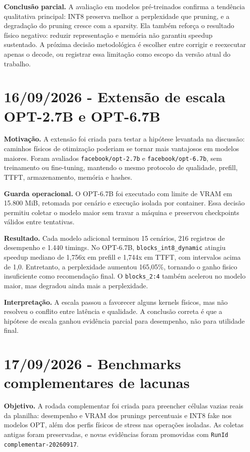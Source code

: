 \textbf{Conclusão parcial.} A avaliação em modelos pré-treinados confirma a
tendência qualitativa principal: INT8 preserva melhor a perplexidade que
pruning, e a degradação do pruning cresce com a sparsity. Ela também reforça o
resultado físico negativo: reduzir representação e memória não garantiu
speedup sustentado. A próxima decisão metodológica é escolher entre corrigir e
reexecutar apenas o decode, ou registrar essa limitação como escopo da versão
atual do trabalho.

\section{16/09/2026 - Extensão de escala OPT-2.7B e OPT-6.7B}

\textbf{Motivação.} A extensão foi criada para testar a hipótese levantada na
discussão: caminhos físicos de otimização poderiam se tornar mais vantajosos em
modelos maiores. Foram avaliados \texttt{facebook/opt-2.7b} e
\texttt{facebook/opt-6.7b}, sem treinamento ou fine-tuning, mantendo o mesmo
protocolo de qualidade, prefill, TTFT, armazenamento, memória e hashes.

\textbf{Guarda operacional.} O OPT-6.7B foi executado com limite de VRAM em
15.800 MiB, retomada por cenário e execução isolada por container. Essa decisão
permitiu coletar o modelo maior sem travar a máquina e preservou checkpoints
válidos entre tentativas.

\textbf{Resultado.} Cada modelo adicional terminou 15 cenários, 216 registros de
desempenho e 1.440 timings. No OPT-6.7B, \texttt{blocks\_\allowbreak{}int8\_\allowbreak{}dynamic}
atingiu speedup mediano de 1,756x em prefill e 1,744x em TTFT, com intervalos
acima de 1,0. Entretanto, a perplexidade aumentou 165,05\%, tornando o ganho
fisico insuficiente como recomendação final. O \texttt{blocks\_\allowbreak{}2:4}
também acelerou no modelo maior, mas degradou ainda mais a perplexidade.

\textbf{Interpretação.} A escala passou a favorecer alguns kernels físicos, mas
não resolveu o conflito entre latência e qualidade. A conclusão correta é que a
hipótese de escala ganhou evidência parcial para desempenho, não para utilidade
final.

\section{17/09/2026 - Benchmarks complementares de lacunas}

\textbf{Objetivo.} A rodada complementar foi criada para preencher células
vazias reais da planilha: desempenho e VRAM dos prunings percentuais e INT8 fake
nos modelos OPT, além dos perfis físicos de stress nas operações isoladas. As
coletas antigas foram preservadas, e novas evidências foram promovidas com
\texttt{RunId complementar-20260917}.

